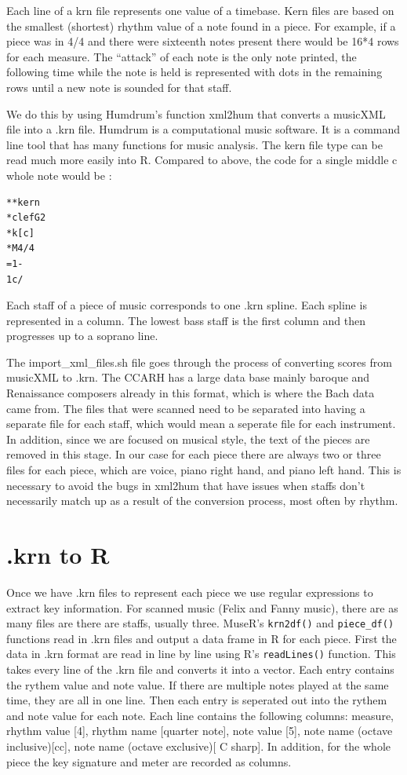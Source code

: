 \documentclass[12pt,twoside]{reedthesis}
\theoremstyle{definition}
\theoremstyle{definition}
\theoremstyle{definition}
\theoremstyle{remark}
\begin{document}
Each line of a krn file represents one value of a timebase. Kern files
are based on the smallest (shortest) rhythm value of a note found in a
piece. For example, if a piece was in 4/4 and there were sixteenth notes
present there would be 16*4 rows for each measure. The ``attack'' of
each note is the only note printed, the following time while the note is
held is represented with dots in the remaining rows until a new note is
sounded for that staff.

We do this by using Humdrum's function xml2hum that converts a musicXML
file into a .krn file. Humdrum is a computational music software. It is
a command line tool that has many functions for music analysis. The kern
file type can be read much more easily into R. Compared to above, the
code for a single middle c whole note would be :
\begin{verbatim}
**kern
*clefG2
*k[c]
*M4/4
=1-
1c/
\end{verbatim}
Each staff of a piece of music corresponds to one .krn spline. Each
spline is represented in a column. The lowest bass staff is the first
column and then progresses up to a soprano line.

The import\_xml\_files.sh file goes through the process of converting
scores from musicXML to .krn. The CCARH has a large data base mainly
baroque and Renaissance composers already in this format, which is where
the Bach data came from. The files that were scanned need to be
separated into having a separate file for each staff, which would mean a
seperate file for each instrument. In addition, since we are focused on
musical style, the text of the pieces are removed in this stage. In our
case for each piece there are always two or three files for each piece,
which are voice, piano right hand, and piano left hand. This is
necessary to avoid the bugs in xml2hum that have issues when staffs
don't necessarily match up as a result of the conversion process, most
often by rhythm.

\section{.krn to R}\label{krn-to-r}

Once we have .krn files to represent each piece we use regular
expressions to extract key information. For scanned music (Felix and
Fanny music), there are as many files are there are staffs, usually
three. MuseR's \texttt{krn2df()} and \texttt{piece\_df()} functions read
in .krn files and output a data frame in R for each piece. First the
data in .krn format are read in line by line using R's
\texttt{readLines()} function. This takes every line of the .krn file
and converts it into a vector. Each entry contains the rythem value and
note value. If there are multiple notes played at the same time, they
are all in one line. Then each entry is seperated out into the rythem
and note value for each note. Each line contains the following columns:
measure, rhythm value {[}4{]}, rhythm name {[}quarter note{]}, note
value {[}5{]}, note name (octave inclusive){[}cc{]}, note name (octave
exclusive){[} C sharp{]}. In addition, for the whole piece the key
signature and meter are recorded as columns.
\end{document}
